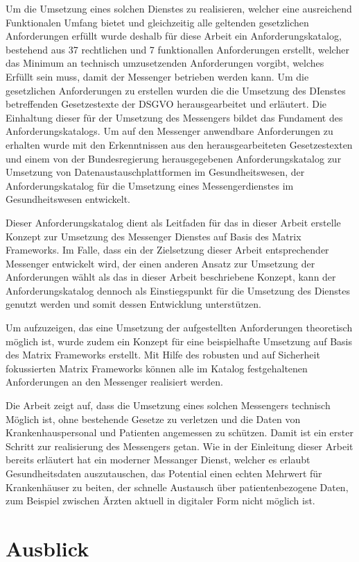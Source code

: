 Um die Umsetzung eines solchen Dienstes zu realisieren, welcher eine ausreichend Funktionalen Umfang bietet und gleichzeitig alle geltenden gesetzlichen Anforderungen erfüllt wurde deshalb für diese Arbeit ein Anforderungskatalog, bestehend aus 37 rechtlichen und 7 funktionallen Anforderungen erstellt, welcher das Minimum an technisch umzusetzenden Anforderungen vorgibt, welches Erfüllt sein muss, damit der Messenger betrieben werden kann. Um die gesetzlichen Anforderungen zu erstellen wurden die die Umsetzung des DIenstes betreffenden Gesetzestexte der DSGVO herausgearbeitet und erläutert. Die Einhaltung dieser für der Umsetzung des Messengers bildet das Fundament des Anforderungskatalogs. Um auf den Messenger anwendbare Anforderungen zu erhalten wurde mit den Erkenntnissen aus den herausgearbeiteten Gesetzestexten und einem von der Bundesregierung herausgegebenen Anforderungskatalog zur Umsetzung von Datenaustauschplattformen im Gesundheitswesen, der Anforderungskatalog für die Umsetzung eines Messengerdienstes im Gesundheitswesen entwickelt.

Dieser Anforderungskatalog dient als Leitfaden für das in dieser Arbeit erstelle Konzept zur Umsetzung des Messenger Dienstes auf Basis des Matrix Frameworks. Im Falle, dass ein der Zielsetzung dieser Arbeit entsprechender Messenger entwickelt wird, der einen anderen Ansatz zur Umsetzung der Anforderungen wählt als das in dieser Arbeit beschriebene Konzept, kann der Anforderungskatalog dennoch als Einstiegspunkt für die Umsetzung des Dienstes genutzt werden und somit dessen Entwicklung unterstützen.

Um aufzuzeigen, das eine Umsetzung der aufgestellten Anforderungen theoretisch möglich ist, wurde zudem ein Konzept für eine beispielhafte Umsetzung auf Basis des Matrix Frameworks erstellt. Mit Hilfe des robusten und auf Sicherheit fokussierten Matrix Frameworks können alle im Katalog festgehaltenen Anforderungen an den Messenger realisiert werden. 

Die Arbeit zeigt auf, dass die Umsetzung eines solchen Messengers technisch Möglich ist, ohne bestehende Gesetze zu verletzen und die Daten von Krankenhauspersonal und Patienten angemessen zu schützen.
Damit ist ein erster Schritt zur realisierung des Messengers getan. Wie in der Einleitung dieser Arbeit bereits erläutert hat ein moderner Messanger Dienst, welcher es erlaubt Gesundheitsdaten auszutauschen, das Potential einen echten Mehrwert für Krankenhäuser zu beiten, der schnelle Austausch über patientenbezogene Daten, zum Beispiel zwischen Ärzten aktuell in digitaler Form nicht möglich ist. 


\section{Ausblick}\label{chapter:fazit}